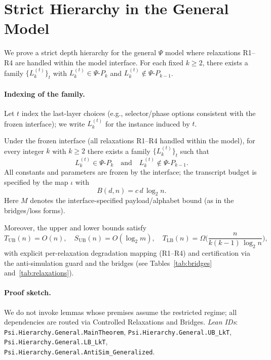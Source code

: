 \section{Strict Hierarchy in the General Model}

We prove a strict depth hierarchy for the general \(\Psi\) model where relaxations R1--R4 are handled within the model interface. For each fixed \(k\ge 2\), there exists a family \(\{L_k^{(t)}\}_t\) with \(L_k^{(t)}\in \Psi\text{-}P_k\) and \(L_k^{(t)}\notin \Psi\text{-}P_{k-1}\).

\paragraph{Indexing of the family.}
\begin{definition}
Let \(t\) index the last-layer choices (e.g., selector/phase options consistent with the frozen interface); we write \(L_k^{(t)}\) for the instance induced by \(t\).
\end{definition}

\begin{theorem}\label{thm:psi-general-hierarchy}
Under the frozen interface (all relaxations R1--R4 handled within the model), for every integer \(k\) with \(k\ge 2\) there exists a family \(\{L_k^{(t)}\}_t\) such that
\[
L_k^{(t)} \in \Psi\text{-}P_k \quad\text{and}\quad L_k^{(t)} \notin \Psi\text{-}P_{k-1}.
\]
All constants and parameters are frozen by the interface; the transcript budget is specified by the map \(\iota\) with
\[
B(d,n) = c\, d\, \log_{2} n .
\]
Here \(M\) denotes the interface-specified payload/alphabet bound (as in the bridges/loss forms).

Moreover, the upper and lower bounds satisfy
\[
T_{\mathrm{UB}}(n) = O(n),\quad S_{\mathrm{UB}}(n) = O(\log_{2} m),\quad
T_{\mathrm{LB}}(n) = \Omega\!\Big(\frac{n}{k(k-1)\,\log_{2} n}\Big),
\]
with explicit per-relaxation degradation mapping (R1--R4) and certification via the anti-simulation guard and the bridges (see Tables~\ref{tab:bridges} and~\ref{tab:relaxations}).
\end{theorem}

\paragraph{Proof sketch.} We do not invoke lemmas whose premises assume the restricted regime; all dependencies are routed via Controlled Relaxations and Bridges. \emph{Lean IDs}: \texttt{Psi.Hierarchy.General.MainTheorem}, \texttt{Psi.Hierarchy.General.UB\_LkT}, \texttt{Psi.Hierarchy.General.LB\_LkT}, \texttt{Psi.Hierarchy.General.AntiSim\_Generalized}.

